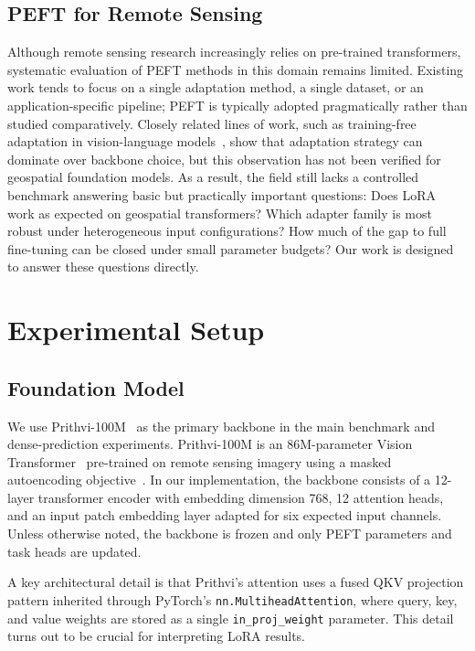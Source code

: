 \documentclass[11pt]{article}
\begin{document}
\subsection{PEFT for Remote Sensing}
Although remote sensing research increasingly relies on pre-trained transformers, systematic evaluation of PEFT methods in this domain remains limited. Existing work tends to focus on a single adaptation method, a single dataset, or an application-specific pipeline; PEFT is typically adopted pragmatically rather than studied comparatively. Closely related lines of work, such as training-free adaptation in vision-language models~\cite{zhang2022tip}, show that adaptation strategy can dominate over backbone choice, but this observation has not been verified for geospatial foundation models. As a result, the field still lacks a controlled benchmark answering basic but practically important questions: Does LoRA~\cite{hu2022lora} work as expected on geospatial transformers? Which adapter family is most robust under heterogeneous input configurations? How much of the gap to full fine-tuning can be closed under small parameter budgets? Our work is designed to answer these questions directly.
\section{Experimental Setup}

\subsection{Foundation Model}
We use Prithvi-100M~\cite{jakubik2023prithvi} as the primary backbone in the main benchmark and dense-prediction experiments. Prithvi-100M is an 86M-parameter Vision Transformer~\cite{dosovitskiy2021vit} pre-trained on remote sensing imagery using a masked autoencoding objective~\cite{he2022mae}. In our implementation, the backbone consists of a 12-layer transformer encoder with embedding dimension 768, 12 attention heads, and an input patch embedding layer adapted for six expected input channels. Unless otherwise noted, the backbone is frozen and only PEFT parameters and task heads are updated.

A key architectural detail is that Prithvi's attention uses a fused QKV projection pattern inherited through PyTorch's \texttt{nn.MultiheadAttention}, where query, key, and value weights are stored as a single \texttt{in\_proj\_weight} parameter. This detail turns out to be crucial for interpreting LoRA results.
\end{document}
